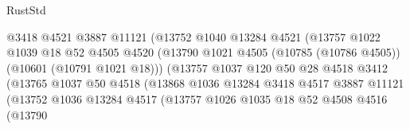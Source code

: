 \begin{lexlean}{RustStd}
\begin{coremodule}
                                      @3418
                                      @4521
                                      @3887
                                      @11121
                                      (@13752
                                        @1040
                                        @13284
                                        @4521
                                        (@13757
                                          @1022
                                          @1039
                                          @18
                                          @52
                                          @4505
                                          @4520
                                          (@13790
                                            @1021
                                            @4505
                                            (@10785 (@10786 @4505))
                                            (@10601 (@10791 @1021 @18)))
                                          (@13757
                                            @1037
                                            @120
                                            @50
                                            @28
                                            @4518
                                            @3412
                                            (@13765
                                              @1037
                                              @50
                                              @4518
                                              (@13868
                                                @1036
                                                @13284
                                                @3418
                                                @4517
                                                @3887
                                                @11121
                                                (@13752
                                                  @1036
                                                  @13284
                                                  @4517
                                                  (@13757
                                                    @1026
                                                    @1035
                                                    @18
                                                    @52
                                                    @4508
                                                    @4516
                                                    (@13790

\end{coremodule}
\end{lexlean}
